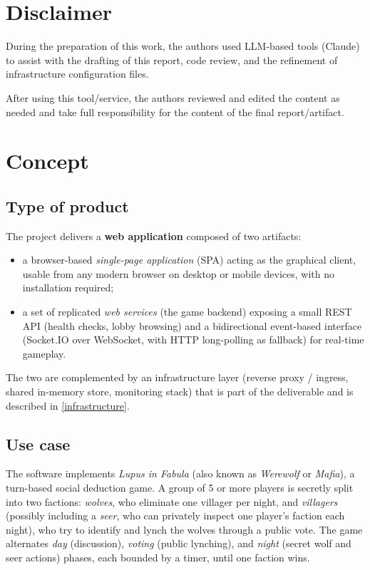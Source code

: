 \documentclass{scrartcl}
\begin{document}
\section*{Disclaimer}

During the preparation of this work, the authors used LLM-based tools
(Claude) to assist with the drafting of this report, code review,
and the refinement of infrastructure configuration files.

After using this tool/service,
the authors reviewed and edited the content as needed
and take full responsibility for the content of the final report/artifact.

\section{Concept}\label{concept}

\subsection{Type of product}

The project delivers a \textbf{web application} composed of two artifacts:

\begin{itemize}
  \item a browser-based \emph{single-page application} (SPA) acting as the
  graphical client, usable from any modern browser on desktop or mobile
  devices, with no installation required;

  \item a set of replicated \emph{web services} (the game backend) exposing a
  small REST API (health checks, lobby browsing) and a bidirectional
  event-based interface (Socket.IO over WebSocket, with HTTP long-polling as
  fallback) for real-time gameplay.
\end{itemize}

The two are complemented by an infrastructure layer (reverse proxy / ingress,
shared in-memory store, monitoring stack) that is part of the deliverable and
is described in \cref{infrastructure}.

\subsection{Use case}

The software implements \emph{Lupus in Fabula} (also known as
\emph{Werewolf} or \emph{Mafia}), a turn-based social deduction game.
%
A group of 5 or more players is secretly split into two factions:
\emph{wolves}, who eliminate one villager per night, and \emph{villagers}
(possibly including a \emph{seer}, who can privately inspect one player's
faction each night), who try to identify and lynch the wolves through a
public vote.
%
The game alternates \emph{day} (discussion), \emph{voting} (public lynching),
and \emph{night} (secret wolf and seer actions) phases, each bounded by a
timer, until one faction wins.
\end{document}
